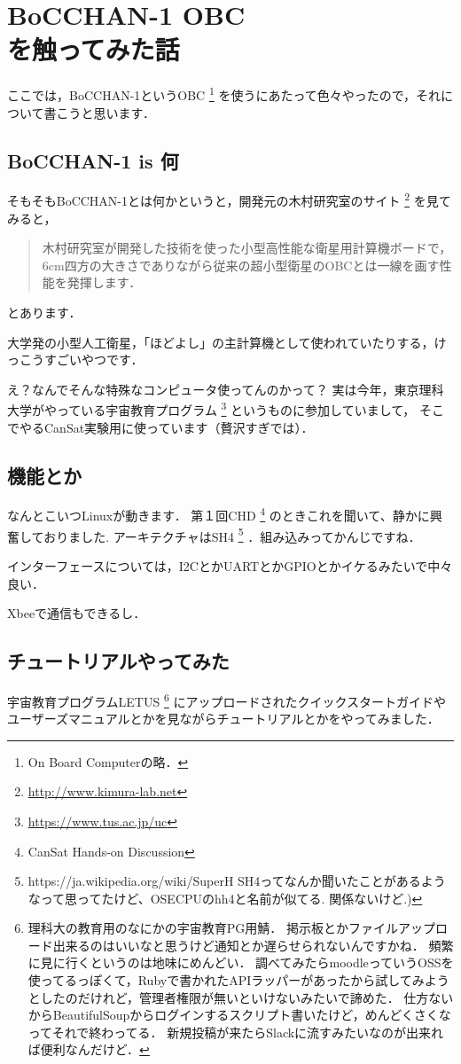 \chapter{BoCCHAN-1 OBC\\を触ってみた話}

ここでは，BoCCHAN-1というOBC
\footnote{On Board Computerの略．}
を使うにあたって色々やったので，それについて書こうと思います．

\section{BoCCHAN-1 is 何}

そもそもBoCCHAN-1とは何かというと，開発元の木村研究室のサイト
\footnote{\url{http://www.kimura-lab.net}}
を見てみると，

\begin{quote}
木村研究室が開発した技術を使った小型高性能な衛星用計算機ボードで，6cm四方の大きさでありながら従来の超小型衛星のOBCとは一線を画す性能を発揮します．
\end{quote}

とあります．

大学発の小型人工衛星，「ほどよし」の主計算機として使われていたりする，けっこうすごいやつです．

え？なんでそんな特殊なコンピュータ使ってんのかって？
実は今年，東京理科大学がやっている宇宙教育プログラム
\footnote{\url{https://www.tus.ac.jp/uc}}
というものに参加していまして，
そこでやるCanSat実験用に使っています（贅沢すぎでは）．

\section{機能とか}
なんとこいつLinuxが動きます．
第１回CHD
\footnote{CanSat Hands-on Discussion}
のときこれを聞いて、静かに興奮しておりました.
アーキテクチャはSH4
\footnote{https://ja.wikipedia.org/wiki/SuperH
SH4ってなんか聞いたことがあるようなって思ってたけど、OSECPUのhh4と名前が似てる.
関係ないけど.)}
．組み込みってかんじですね．

インターフェースについては，I2CとかUARTとかGPIOとかイケるみたいで中々良い．

Xbeeで通信もできるし．

\section{チュートリアルやってみた}

宇宙教育プログラムLETUS
\footnote{理科大の教育用のなにかの宇宙教育PG用鯖．
掲示板とかファイルアップロード出来るのはいいなと思うけど通知とか遅らせられないんですかね．
頻繁に見に行くというのは地味にめんどい．
調べてみたらmoodleっていうOSSを使ってるっぽくて，Rubyで書かれたAPIラッパーがあったから試してみようとしたのだけれど，管理者権限が無いといけないみたいで諦めた．
仕方ないからBeautifulSoupからログインするスクリプト書いたけど，めんどくさくなってそれで終わってる．
新規投稿が来たらSlackに流すみたいなのが出来れば便利なんだけど．}
にアップロードされたクイックスタートガイドやユーザーズマニュアルとかを見ながらチュートリアルとかをやってみました．

